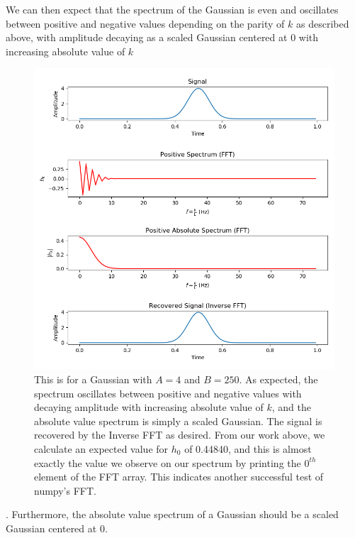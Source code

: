 \documentclass[11pt]{article}
\begin{document}
\begin{enumerate}
	We can then expect that the spectrum of the Gaussian is even and oscillates between positive and negative values depending on the parity of $k$ as described above, with amplitude decaying as a scaled Gaussian centered at 0 with increasing absolute value of $k$
	\begin{figure}[htp]
	\centering
	\includegraphics[scale=0.90]{gaussian_signal.png}
	\caption{This is for a Gaussian with $A=4$ and $B=250$. As expected, the spectrum oscillates between positive and negative values with decaying amplitude with increasing absolute value of $k$, and the absolute value spectrum is simply a scaled Gaussian. The signal is recovered by the Inverse FFT as desired. From our work above, we calculate an expected value for $h_0$ of 0.44840, and this is almost exactly the value we observe on our spectrum by printing the $0^{th}$ element of the FFT array. This indicates another successful test of numpy's FFT.}
	\label{gaussian_signal}
	\end{figure}. Furthermore, the absolute value spectrum of a Gaussian should be a scaled Gaussian centered at 0.
\end{enumerate}

	\newpage
\end{document}

